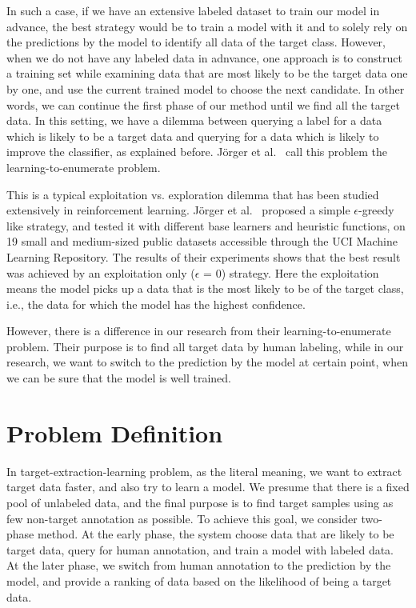 \documentclass{deime}
\begin{document}
In such a case, if we have an extensive labeled dataset to train our
model in advance, the best strategy would be to train a model with it
and to solely rely on the predictions by the model to identify all
data of the target class.  However, when we do not have any labeled
data in adnvance, one approach is to construct a training set while
examining data that are most likely to be the target data one by one,
and use the current trained model to choose the next candidate.  In
other words, we can continue the first phase of our method until we
find all the target data.  In this setting, we have a dilemma between
querying a label for a data which is likely to be a target data and
querying for a data which is likely to improve the classifier, as
explained before.  J\"{o}rger et al.\ \cite{enumerate} call this
problem the learning-to-enumerate problem.

This is a typical exploitation vs. exploration dilemma that has been
studied extensively in reinforcement learning. J\"{o}rger et al.\
\cite{enumerate} proposed a simple $\epsilon$-greedy like strategy,
and tested it with different base learners and heuristic functions, on
19 small and medium-sized public datasets accessible through the UCI
Machine Learning Repository.  The results of their experiments shows
that the best result was achieved by an exploitation only ($\epsilon$
= 0) strategy.  Here the exploitation means the model picks up a data
that is the most likely to be of the target class, i.e., the data for
which the model has the highest confidence.

However, there is a difference in our research from their
learning-to-enumerate problem.  Their purpose is to find all target
data by human labeling, while in our research, we want to switch to
the prediction by the model at certain point, when we can be sure that
the model is well trained.

\section{Problem Definition}
\label{sec:problem}

In target-extraction-learning problem, as the literal meaning, we want
to extract target data faster, and also try to learn a model. We
presume that there is a fixed pool of unlabeled data, and the final
purpose is to find target samples using as few non-target annotation
as possible. To achieve this goal, we consider two-phase method. At
the early phase, the system choose data that are likely to be target
data, query for human annotation, and train a model with labeled
data. At the later phase, we switch from human annotation to the
prediction by the model, and provide a ranking of data based on the
likelihood of being a target data.
\end{document}

